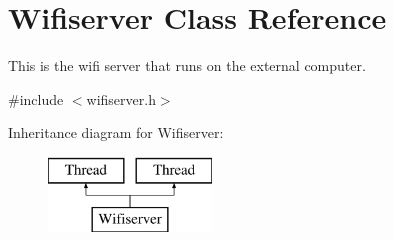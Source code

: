 \hypertarget{class_wifiserver}{\section{Wifiserver Class Reference}
\label{class_wifiserver}
}


This is the wifi server that runs on the external computer.  




{\ttfamily \#include $<$wifiserver.\-h$>$}

Inheritance diagram for Wifiserver\-:\begin{figure}[H]
\begin{center}
\leavevmode
\includegraphics[height=2.000000cm]{class_wifiserver}
\end{center}
\end{figure}
